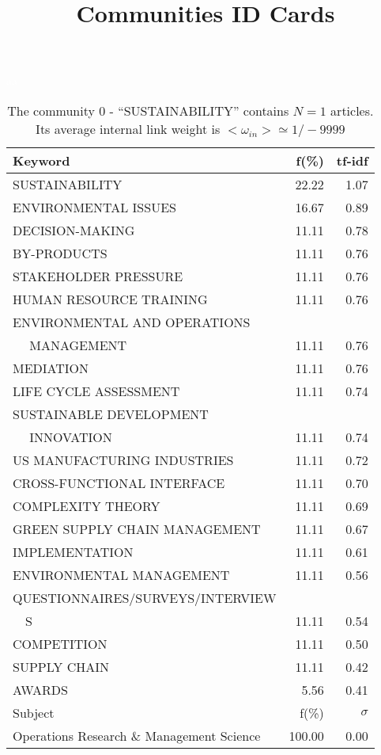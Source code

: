 \documentclass[a4paper,11pt]{report}
\title{{\bf Communities ID Cards}}
\date{\begin{flushleft}This document gather the ``ID Cards'' of the CC communities found within your database.\\
 The CC network was built by keeping a link between articles sharing at least 5 references. The communities characterized here correspond to the ones found in the level 0 (in the sense of the Louvain algo) which gathers more than 0 articles.\\
 These ID cards displays the most frequent keywords, subject categories, journals of publication, institution, countries, authors, references and reference journals of the articles of each community. The significance of an item $\sigma = \sqrt{N} (f - p) / \sqrt{p(1-p)}$ [where $N$ is the number of articles within the community and $f$ and $p$ are the proportion of articles respectively within the community and within the database displaying that item ] is also given (for example $\sigma > 5$ is really highly significant). The tf-idf value which can be calculated by $tf-idf = f*log(frac{1}{p})$ is also given.\\
\vspace{1cm}
\copyright Sebastian Grauwin, Liu Weizhi - (2014) \end{flushleft}}
\begin{document}
\begin{landscape}
\maketitle
\clearpage

\begin{table}[!ht]
\caption{The community 0 - ``SUSTAINABILITY'' contains $N = 1$ articles. Its average internal link weight is $<\omega_{in}> \simeq 1/-9999$ }
\textcolor{white}{aa}\\
{\scriptsize\begin{tabular}{|l r  r|}
\hline
Keyword & f(\%) & tf-idf \\
\hline
SUSTAINABILITY & 22.22 & 1.07\\
ENVIRONMENTAL ISSUES & 16.67 & 0.89\\
DECISION-MAKING & 11.11 & 0.78\\
BY-PRODUCTS & 11.11 & 0.76\\
STAKEHOLDER PRESSURE & 11.11 & 0.76\\
HUMAN RESOURCE TRAINING & 11.11 & 0.76\\
ENVIRONMENTAL AND OPERATIONS &  &\\
$\quad$ MANAGEMENT & 11.11 & 0.76\\
MEDIATION & 11.11 & 0.76\\
LIFE CYCLE ASSESSMENT & 11.11 & 0.74\\
SUSTAINABLE DEVELOPMENT &  &\\
$\quad$ INNOVATION & 11.11 & 0.74\\
US MANUFACTURING INDUSTRIES & 11.11 & 0.72\\
CROSS-FUNCTIONAL INTERFACE & 11.11 & 0.70\\
COMPLEXITY THEORY & 11.11 & 0.69\\
GREEN SUPPLY CHAIN MANAGEMENT & 11.11 & 0.67\\
IMPLEMENTATION & 11.11 & 0.61\\
ENVIRONMENTAL MANAGEMENT & 11.11 & 0.56\\
QUESTIONNAIRES/SURVEYS/INTERVIEW &  &\\
$\quad$S & 11.11 & 0.54\\
COMPETITION & 11.11 & 0.50\\
SUPPLY CHAIN & 11.11 & 0.42\\
AWARDS & 5.56 & 0.41\\
\hline
\hline
Subject & f(\%) & $\sigma$\\
\hline
Operations Research \& Management Science & 100.00 & 0.00\\

\end{tabular}}
\end{table}
\end{landscape}
\end{document}
